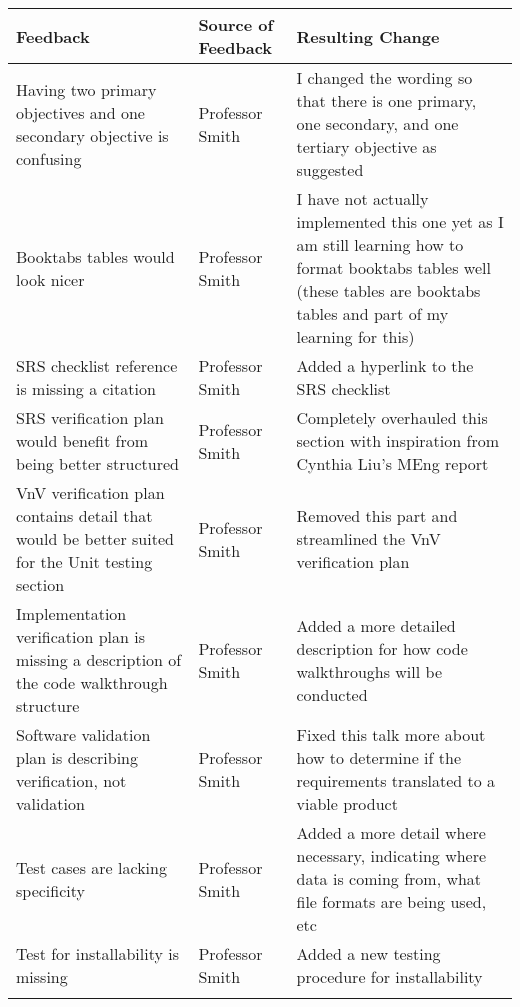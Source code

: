 \documentclass{article}
\begin{document}
\begin{longtable}{p{5cm}p{4cm}p{5cm}}\toprule
    Feedback & Source of Feedback & Resulting Change \\\midrule
    Having two primary objectives and one secondary objective is confusing & Professor Smith & I changed the wording so that there is one primary, one secondary, and one tertiary objective as suggested \\
    \addlinespace[0.5cm]
    
    Booktabs tables would look nicer & Professor Smith & I have not actually implemented this one yet as I am still learning how to format booktabs tables well (these tables are booktabs tables and part of my learning for this) \\
    \addlinespace[0.5cm]

    SRS checklist reference is missing a citation & Professor Smith & Added a hyperlink to the SRS checklist \\
    \addlinespace[0.5cm]

    SRS verification plan would benefit from being better structured & Professor Smith & Completely overhauled this section with inspiration from Cynthia Liu's MEng report \\
    \addlinespace[0.5cm]

    VnV verification plan contains detail that would be better suited for the Unit testing section & Professor Smith & Removed this part and streamlined the VnV verification plan \\
    \addlinespace[0.5cm]

    Implementation verification plan is missing a description of the code walkthrough structure & Professor Smith & Added a more detailed description for how code walkthroughs will be conducted \\
    \addlinespace[0.5cm]

    Software validation plan is describing verification, not validation & Professor Smith & Fixed this talk more about how to determine if the requirements translated to a viable product \\
    \addlinespace[0.5cm]

    Test cases are lacking specificity & Professor Smith & Added a more detail where necessary, indicating where data is coming from, what file formats are being used, etc \\
    \addlinespace[0.5cm]

    Test for installability is missing & Professor Smith & Added a new testing procedure for installability \\
    \addlinespace[0.5cm]


\end{longtable}
\end{document}
